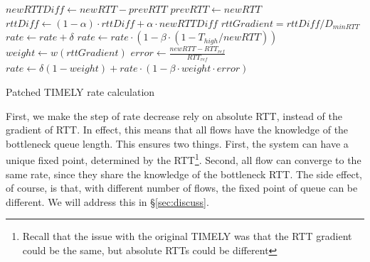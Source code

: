 \begin{algorithm}[t]
\footnotesize
{
\begin{algorithmic}[1]
\State $newRTTDiff \gets newRTT - prevRTT$
\State $prevRTT \gets newRTT$
\State $rttDiff \gets (1-\alpha) \cdot rttDiff + \alpha \cdot newRTTDiff$
\State $rttGradient = rttDiff/D_{minRTT}$
        \State $rate \gets rate + \delta$
        \State $rate \gets rate \cdot  (1 - \beta \cdot (1 - T_{high}/newRTT))$
\Else
		\State $weight \gets w(rttGradient)$	
		\State $error \gets \frac{{newRTT - RT{T_{ref}}}}{{RT{T_{ref}}}}$
        \State $rate \gets \delta (1-weight) +  rate \cdot (1 - \beta \cdot weight  \cdot error)$
\EndIf 
\end{algorithmic}
}
\caption{Patched TIMELY rate calculation}
\label{fig:timely_fixed_algo}
\end{algorithm}

First, we make the step of rate decrease rely on absolute RTT, instead of the
gradient of RTT. In effect, this means that all flows have the knowledge of the
bottleneck queue length.  This ensures two things. First, the system can have a
unique fixed point, determined by the RTT\footnote{Recall that the issue with
the original TIMELY was that the RTT gradient could be the same, but absolute
RTTs could be different}.  Second, all flow can converge to the same rate, since
they share the knowledge of the bottleneck RTT.  The side effect, of course, is
that, with different number of flows, the fixed point of queue can be different.
We will address this in \S\ref{sec:discuss}. 


